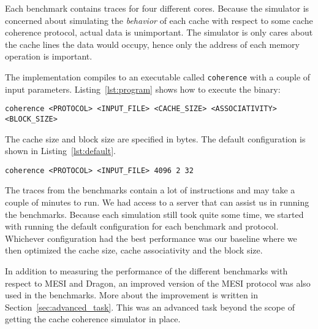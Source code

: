 Each benchmark contains traces for four different cores. Because the simulator is concerned about
simulating the \emph{behavior} of each cache with respect to some cache coherence
protocol, actual data is unimportant. The simulator is only cares about the
cache lines the data would occupy, hence only the address of each memory
operation is important.

The implementation compiles to an executable called \texttt{coherence} with
a couple of input parameters. Listing~\ref{lst:program} shows how to execute the
binary:
\begin{lstlisting}[label=lst:program]
coherence <PROTOCOL> <INPUT_FILE> <CACHE_SIZE> <ASSOCIATIVITY> <BLOCK_SIZE>
\end{lstlisting}
The cache size and block size are specified in bytes. The default configuration
is shown in Listing~\ref{lst:default}.
\begin{lstlisting}[label=lst:default]
coherence <PROTOCOL> <INPUT_FILE> 4096 2 32
\end{lstlisting}
The traces from the benchmarks contain a lot of instructions and may take a couple of minutes to run. We had
access to a server that can assist us in running the benchmarks. Because
each simulation still took quite some time, we started with running the default
configuration for each benchmark and protocol. Whichever configuration had the best
performance was our baseline where we then optimized the cache size, cache associativity and the block size.

In addition to measuring the performance of the different benchmarks with respect to
MESI and Dragon, an improved version of the MESI protocol was also used in
the benchmarks. More about the improvement is written in Section~\ref{sec:advanced_task}. This was an advanced task beyond the scope of
getting the cache coherence simulator in place.


